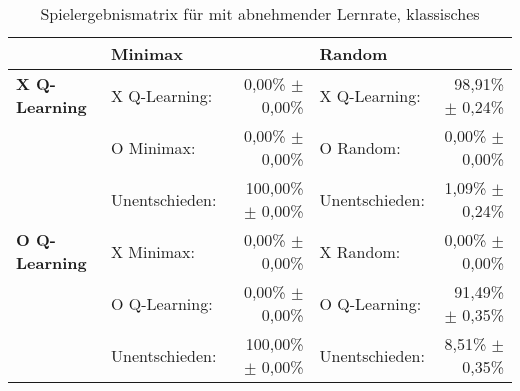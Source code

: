 \begin{table}[h]
\centering
\caption[Spielergebnismatrix \qlearning: abnehmende Lernrate, klassisches \splay]{Spielergebnismatrix für \qlearning mit abnehmender Lernrate, klassisches \splay}
\label{tab:resultmatrix_ql_normal_alpha_decay}

\begin{tabular}{llrlr}
\toprule
 & \multicolumn{2}{l}{\textbf{Minimax}} & \multicolumn{2}{l}{\textbf{Random}} \\ \midrule
\textbf{X Q-Learning}   & X Q-Learning:     & 0,00\% $\pm$    0,00\%            & X Q-Learning:         & 98,91\% $\pm$ 0,24\%  \\
                        & O Minimax:        & 0,00\% $\pm$    0,00\%            & O Random:             & 0,00\% $\pm$  0,00\%  \\
                        & Unentschieden:    & 100,00\% $\pm$  0,00\%            & Unentschieden:        & 1,09\% $\pm$  0,24\%  \\ \cmidrule{2-5}
\textbf{O Q-Learning}   & X Minimax:        & 0,00\% $\pm$    0,00\%            & X Random:             & 0,00\% $\pm$  0,00\%  \\
                        & O Q-Learning:     & 0,00\% $\pm$    0,00\%            & O Q-Learning:         & 91,49\% $\pm$ 0,35\%  \\
                        & Unentschieden:    & 100,00\% $\pm$  0,00\%            & Unentschieden:        & 8,51\% $\pm$  0,35\%  \\ \bottomrule
\end{tabular}
\end{table}